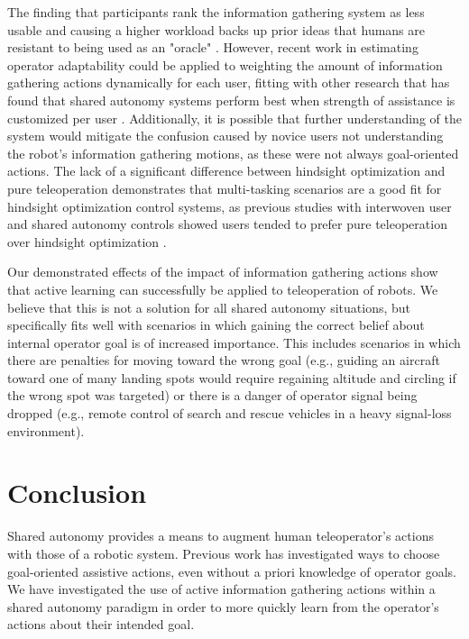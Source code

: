 \documentclass[conference]{IEEEtran}
\begin{document}
The finding that participants rank the information gathering system as less usable and causing a higher workload backs up prior ideas that humans are resistant to being used as an "oracle" \cite{javdani2015shared}. However, recent work in estimating operator adaptability \cite{nikolaidis2017human} could be applied to weighting the amount of information gathering actions dynamically for each user, fitting with other research that has found that shared autonomy systems perform best when strength of assistance is customized per user \cite{gopinath2017human}. Additionally, it is possible that further understanding of the system would mitigate the confusion caused by novice users not understanding the robot's information gathering motions, as these were not always goal-oriented actions. The lack of a significant difference between hindsight optimization and pure teleoperation demonstrates that multi-tasking scenarios are a good fit for hindsight optimization control systems, as previous studies with interwoven user and shared autonomy controls showed users tended to prefer pure teleoperation over hindsight optimization \cite{javdani2018shared}.

Our demonstrated effects of the impact of information gathering actions show that active learning can successfully be applied to teleoperation of robots. We believe that this is not a solution for all shared autonomy situations, but specifically fits well with scenarios in which gaining the correct belief about internal operator goal is of increased importance. This includes scenarios in which there are penalties for moving toward the wrong goal (e.g., guiding an aircraft toward one of many landing spots would require regaining altitude and circling if the wrong spot was targeted) or there is a danger of operator signal being dropped (e.g., remote control of search and rescue vehicles in a heavy signal-loss environment).

\section{Conclusion}

Shared autonomy provides a means to augment human teleoperator's actions with those of a robotic system. Previous work has investigated ways to choose goal-oriented assistive actions, even without a priori knowledge of operator goals. We have investigated the use of active information gathering actions within a shared autonomy paradigm in order to more quickly learn from the operator's actions about their intended goal.
\end{document}
